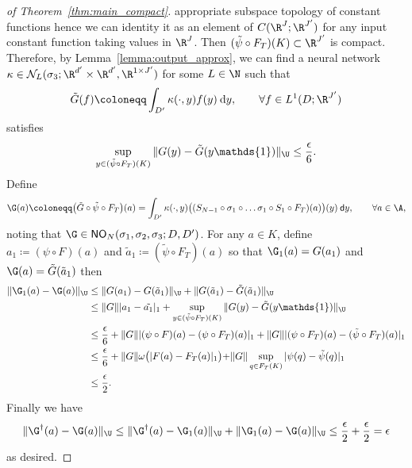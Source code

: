 \begin{proof}[of Theorem~\ref{thm:main_compact}]
appropriate subspace topology of constant functions hence we can identity it as an element of \(C(\R^J;\R^{J'})\)
for any input constant function taking values in \(\R^J\).
Then \((\tilde{\psi} \circ F_T)(K) \subset \R^{J'}\) is compact. 
Therefore, by Lemma~\ref{lemma:output_approx}, we can find a neural network
\(\kappa \in \mathcal{N}_L (\sigma_3; \R^{d'} \times \R^{d'}, \R^{1 \times J'})\) for some \(L \in \N\) such that
\[\tilde{G} (f) \coloneqq \int_{D'} \kappa (\cdot, y) f(y) \: \text{d}y, \qquad \forall f \in L^1(D;\R^{J'})\]
satisfies
\[\sup_{y \in (\tilde{\psi}  \circ F_T)(K)} \|G (y) - \tilde{G} (y \mathds{1}) \|_\U \leq \frac{\epsilon}{6}.\]
Define
\[\G(a) \coloneqq \bigl (\tilde{G} \circ \tilde{\psi} \circ F_T \bigl)(a) = \int_{D'} \kappa(\cdot,y) \bigl ( (S_{N-1} \circ \sigma_1 \circ \dots \sigma_1 \circ S_1 \circ F_T)(a)\bigl) (y)\: \mathsf{d}y, \qquad \forall a \in \A,\]
noting that \(\G \in \mathsf{NO}_{N}(\sigma_1,\sigma_2,\sigma_3;D,D')\).
For any \(a \in K\), define \(a_1 \coloneqq (\psi \circ F) (a)\) and \(\tilde{a}_1 \coloneqq (\tilde{\psi} \circ F_T)(a)\) so that $\G_1(a)=G(a_1)$ and $\G(a)=\tilde{G} (\tilde{a}_1)$ then
\begin{align*}
    \|\G_1(a) - \G(a)\|_\U &\leq \|G (a_1) - G ( \tilde{a}_1) \|_\U + \|G (\tilde{a}_1) - \tilde{G} (\tilde{a}_1) \|_\U \\
    &\leq \|G\| |a_1 - \tilde{a_1}|_1 + \sup_{y \in (\tilde{\psi} \circ F_T)(K)} \|G (y) - \tilde{G} (y \mathds{1}) \|_\U \\
    &\leq \frac{\epsilon}{6} + \|G\| |(\psi \circ F)(a) - (\psi \circ F_T)(a) |_1 + \|G\| |(\psi \circ F_T)(a) - (\tilde{\psi} \circ F_T)(a) |_1\\
    &\leq \frac{\epsilon}{6} + \|G\| \omega \bigl ( |F(a) - F_T (a)|_1 \bigl ) + \|G\| \sup_{q \in F_T (K)} |\psi(q) - \tilde{\psi}(q)|_1  \\
    &\leq \frac{\epsilon}{2}.
\end{align*}
Finally we have
\begin{align*}
    \|\G^\dagger(a) - \G(a)\|_\U \leq \|\G^\dagger (a) - \G_1(a) \|_\U + \|\G_1(a) - \G(a)\|_\U \leq \frac{\epsilon}{2} + \frac{\epsilon}{2} = \epsilon 
\end{align*}
as desired.


\end{proof}
